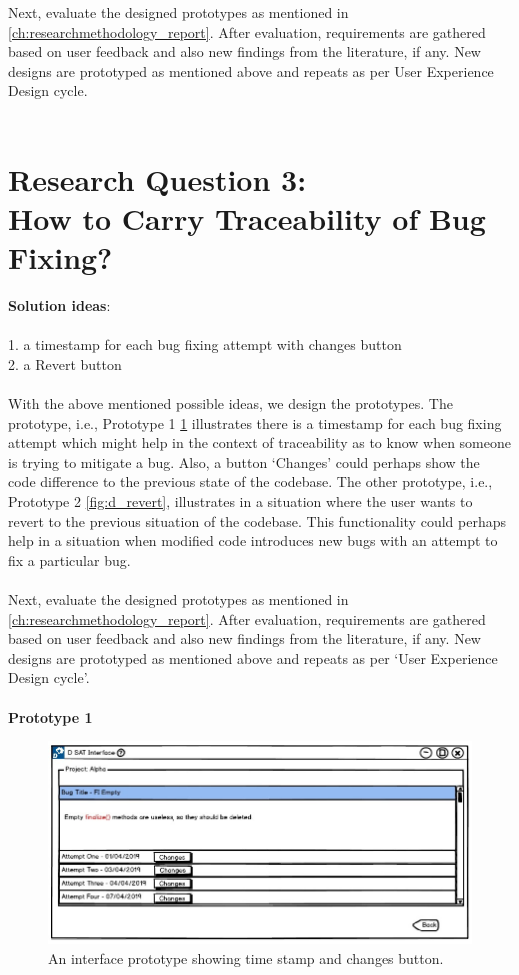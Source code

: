 Next, evaluate the designed prototypes as mentioned in \autoref{ch:researchmethodology_report}. After evaluation, requirements are gathered based on user feedback and also new findings from the literature, if any. New designs are prototyped as mentioned above and repeats as per User Experience Design cycle. \\ \\

\section{Research Question 3:  \\ How to Carry Traceability of Bug Fixing?}

\textbf{Solution ideas}: \\ \\
1. a timestamp for each bug fixing attempt with changes button \\
2. a Revert button \\ \\

With the above mentioned possible ideas, we design the prototypes. The prototype, i.e., Prototype 1 \ref{fig:d_changes} illustrates there is a timestamp for each bug fixing attempt which might help in the context of traceability as to know when someone is trying to mitigate a bug. Also, a button ‘Changes’ could perhaps show the code difference to the previous state of the codebase. The other prototype, i.e., Prototype 2 \ref{fig:d_revert}, illustrates in a situation where the user wants to revert to the previous situation of the codebase. This functionality could perhaps help in a situation when modified code introduces new bugs with an attempt to fix a particular bug. \\ \\

Next, evaluate the designed prototypes as mentioned in \autoref{ch:researchmethodology_report}. After evaluation, requirements are gathered based on user feedback and also new findings from the literature, if any. New designs are prototyped as mentioned above and repeats as per ‘User Experience Design cycle’. \\ \\

\textbf{Prototype 1}
\begin{figure}[hbt!]
	\centering
	\includegraphics[width=\linewidth]{figures/d_changes}
	\caption{An interface prototype showing time stamp and changes button.}
	\label{fig:d_changes}
\end{figure}

